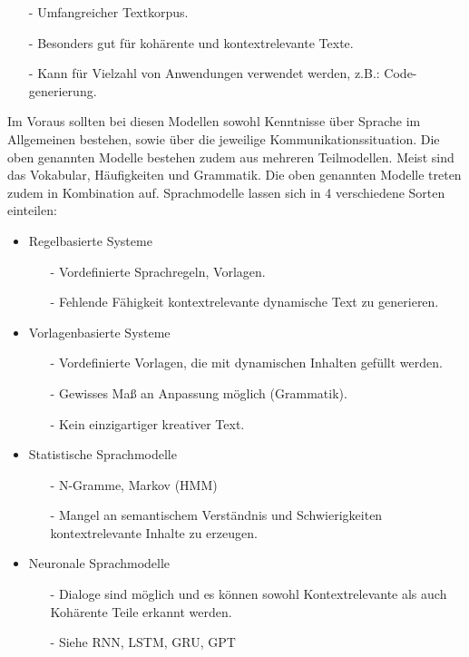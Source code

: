 \documentclass[12pt]{article}
\begin{document}
\begin{itemize}
\begin{itemize}
\begin{itemize}
			            \item[-] Umfangreicher Textkorpus.
			            \item[-] Besonders gut für kohärente und kontextrelevante Texte.
			            \item[-] Kann für Vielzahl von Anwendungen verwendet werden, z.B.: Code-generierung.
		            \end{itemize}
	      \end{itemize}
\end{itemize}


Im Voraus sollten bei diesen Modellen sowohl Kenntnisse über Sprache im Allgemeinen bestehen, sowie über die jeweilige Kommunikationssituation. Die oben genannten Modelle bestehen zudem aus mehreren Teilmodellen. Meist sind das Vokabular, Häufigkeiten und Grammatik. Die oben genannten Modelle treten zudem in Kombination auf.
Sprachmodelle lassen sich in 4 verschiedene Sorten einteilen:

\begin{itemize}
	\item Regelbasierte Systeme \cite[vgl.]{thamm}
	      \begin{itemize}
		      \item[-] Vordefinierte Sprachregeln, Vorlagen.
		      \item[-] Fehlende Fähigkeit kontextrelevante dynamische Text zu generieren.
	      \end{itemize}
	\item Vorlagenbasierte Systeme
	      \begin{itemize}
		      \item[-] Vordefinierte Vorlagen, die mit dynamischen Inhalten gefüllt werden.
		      \item[-] Gewisses Maß an Anpassung möglich (Grammatik).
		      \item[-] Kein einzigartiger kreativer Text.
	      \end{itemize}
	\item Statistische Sprachmodelle
	      \begin{itemize}
		      \item[-] N-Gramme, Markov (HMM)
		      \item[-] Mangel an semantischem Verständnis und Schwierigkeiten kontextrelevante Inhalte zu erzeugen.
	      \end{itemize}
	\item Neuronale Sprachmodelle
	      \begin{itemize}
		      \item[-] Dialoge sind möglich und es können sowohl Kontextrelevante als auch Kohärente Teile erkannt werden.
		      \item[-] Siehe RNN, LSTM, GRU, GPT
	      \end{itemize}
\end{itemize}
\end{document}
